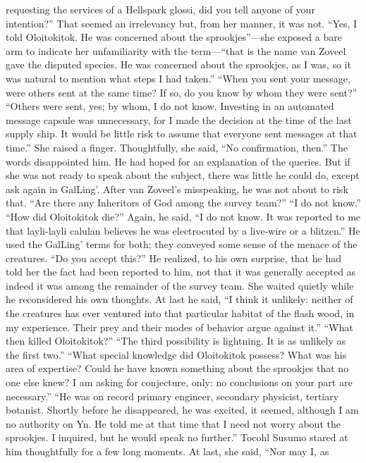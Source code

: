 \documentclass[9pt]{article}
\begin{document}
requesting the services of a Hellspark glossi, did you tell anyone of your intention?”
That seemed an irrelevancy but, from her manner, it was not. “Yes, I told Oloitokitok. He was
concerned about the sprookjes”—she exposed a bare arm to indicate her unfamiliarity with the
term—“that is the name van Zoveel gave the disputed species. He was concerned about the sprookjes,
as I was, so it was natural to mention what steps I had taken.”
“When you sent your message, were others sent at the same time? If so, do you know by whom they
were sent?”
“Others were sent, yes; by whom, I do not know. Investing in an automated message capsule was
unnecessary, for I made the decision at the time of the last supply ship. It would be little risk to assume
that everyone sent messages at that time.”
She raised a finger. Thoughtfully, she said, “No confirmation, then.”
The words disappointed him. He had hoped for an explanation of the queries. But if she was not
ready to speak about the subject, there was little he could do, except ask again in GalLing’. After van
Zoveel’s misspeaking, he was not about to risk that.
“Are there any Inheritors of God among the survey team?”
“I do not know.”
“How did Oloitokitok die?”
Again, he said, “I do not know. It was reported to me that layli-layli calulan believes he was
electrocuted by a live-wire or a blitzen.” He used the GalLing’ terms for both; they conveyed some sense
of the menace of the creatures.
“Do you accept this?”
He realized, to his own surprise, that he had told her the fact had been reported to him, not that it
was generally accepted as indeed it was among the remainder of the survey team. She waited quietly
while he reconsidered his own thoughts. At last he said, “I think it unlikely: neither of the creatures has
ever ventured into that particular habitat of the flash wood, in my experience. Their prey and their modes
of behavior argue against it.”
“What then killed Oloitokitok?”
“The third possibility is lightning. It is as unlikely as the first two.”
“What special knowledge did Oloitokitok possess? What was his area of expertise? Could he have
known something about the sprookjes that no one else knew? I am asking for conjecture, only: no
conclusions on your part are necessary.”
“He was on record primary engineer, secondary physicist, tertiary botanist. Shortly before he
disappeared, he was excited, it seemed, although I am no authority on Yn. He told me at that time that I
need not worry about the sprookjes. I inquired, but he would speak no further.”
Tocohl Susumo stared at him thoughtfully for a few long moments. At last, she said, “Nor may I, as
\end{document}

